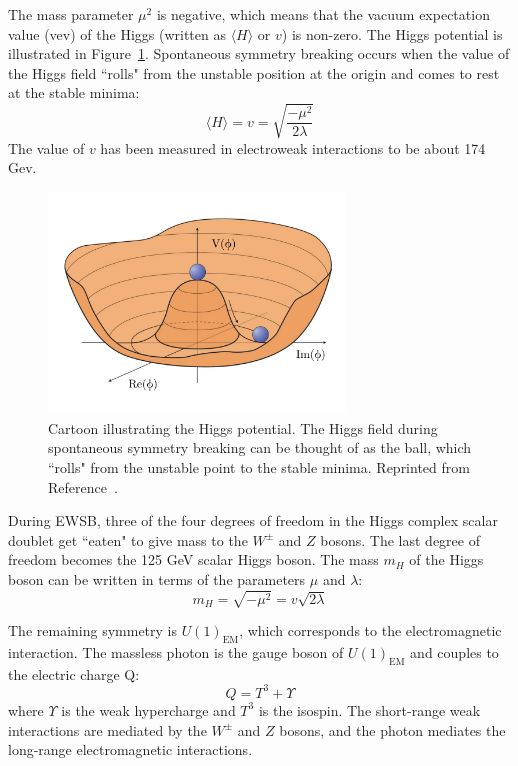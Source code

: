 The mass parameter $\mu^2$ is negative, which means that the vacuum expectation value (vev) of the Higgs (written as $\langle H \rangle$ or $v$) is non-zero. The Higgs potential is illustrated in Figure~\ref{fig:HiggsV}. Spontaneous symmetry breaking occurs when the value of the Higgs field ``rolls" from the unstable position at the origin and comes to rest at the stable minima:
\begin{equation}
\langle H \rangle= v = \sqrt{\frac{-\mu^2}{2\lambda}}
\end{equation}
The value of $v$ has been measured in electroweak interactions to be about 174 Gev. 

\begin{figure}[htbp]
    \centering
    \includegraphics[width=0.7\textwidth]{Figures/Theory/improvedMexicanHat.pdf}
    \caption[Cartoon illustrating the Higgs potential.]{Cartoon illustrating the Higgs potential. The Higgs field during spontaneous symmetry breaking can be thought of as the ball, which ``rolls" from the unstable point to the stable minima.
    Reprinted from Reference~\cite{mexicanHat}.}
    \label{fig:HiggsV}
\end{figure}

During EWSB, three of the four degrees of freedom in the Higgs complex scalar doublet get ``eaten" to give mass to the $W^\pm$ and $Z$ bosons. The last degree of freedom becomes the 125 GeV scalar Higgs boson. The mass $m_H$ of the Higgs boson can be written in terms of the parameters $\mu$ and $\lambda$: 
\begin{equation}
m_H = \sqrt{-\mu^2} = v\sqrt{2\lambda}
\label{equ:HiggsMass}
\end{equation}

The remaining symmetry is $U(1)_{\textrm{EM}}$, which corresponds to the electromagnetic interaction. The massless photon is the gauge boson of $U(1)_{\textrm{EM}}$ and couples to the electric charge Q: 
\begin{equation}
Q = T^3 + \Upsilon
\end{equation}
where $\Upsilon$ is the weak hypercharge and $T^3$ is the isospin. The short-range weak interactions are mediated by the $W^\pm$ and $Z$ bosons, and the photon mediates the long-range electromagnetic interactions.


